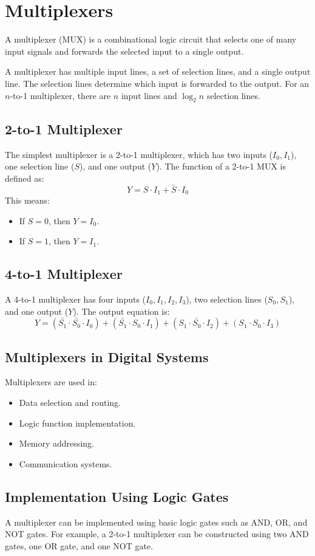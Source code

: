 \section{Multiplexers}
A multiplexer (MUX) is a combinational logic circuit that
selects one of many input signals and forwards the selected
input to a single output.

A multiplexer has multiple input lines, a set of selection lines,
and a single output line. The selection lines determine which
input is forwarded to the output. For an $n$-to-1 multiplexer,
there are $n$ input lines and $\log_2 n$ selection lines.

\subsection*{2-to-1 Multiplexer}
The simplest multiplexer is a 2-to-1 multiplexer, which has two
inputs ($I_0, I_1$), one selection line ($S$), and one output ($Y$).
The function of a 2-to-1 MUX is defined as:
\[
    Y = S \cdot I_1 + \bar{S} \cdot I_0
\]
This means:
\begin{itemize}
    \item If $S = 0$, then $Y = I_0$.
    \item If $S = 1$, then $Y = I_1$.
\end{itemize}

\subsection*{4-to-1 Multiplexer}
A 4-to-1 multiplexer has four inputs ($I_0, I_1, I_2, I_3$), two
selection lines ($S_0, S_1$), and one output ($Y$). The output equation is:
\[
    Y = (\bar{S_1} \cdot \bar{S_0} \cdot I_0) + (\bar{S_1} \cdot S_0 \cdot I_1) + (S_1 \cdot \bar{S_0} \cdot I_2) + (S_1 \cdot S_0 \cdot I_3)
\]

\subsection*{Multiplexers in Digital Systems}
Multiplexers are used in:
\begin{itemize}
    \item Data selection and routing.
    \item Logic function implementation.
    \item Memory addressing.
    \item Communication systems.
\end{itemize}

\subsection*{Implementation Using Logic Gates}
A multiplexer can be implemented using basic logic gates such as
AND, OR, and NOT gates. For example, a 2-to-1 multiplexer can be
constructed using two AND gates, one OR gate, and one NOT gate.
